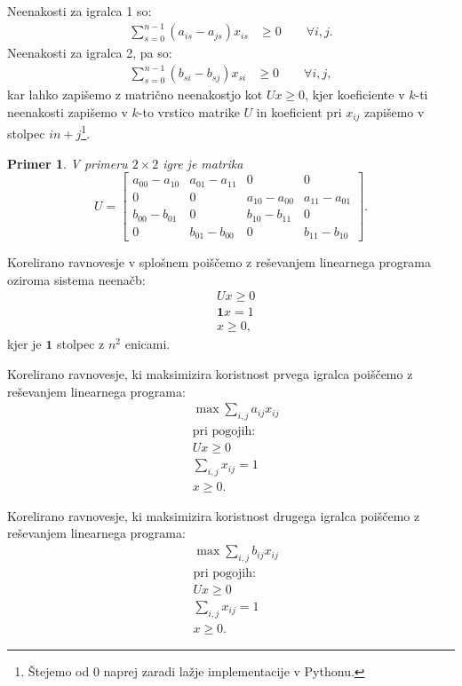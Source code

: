 \documentclass{article}
\newtheorem{example}{Primer}
\begin{document}
Neenakosti za igralca 1 so:
\begin{align*}
    \sum_{s = 0}^{n-1} (a_{is} - a_{js})x_{is} &\geq 0 \qquad \forall i,j.
\end{align*}
Neenakosti za igralca 2, pa so:
\begin{align*}
    \sum_{s = 0}^{n-1} (b_{si} - b_{sj})x_{si} &\geq 0 \qquad \forall i,j,
\end{align*}
kar lahko zapišemo z matrično neenakostjo kot $U x \geq 0$, kjer koeficiente v $k$-ti neenakosti zapišemo v $k$-to vrstico matrike $U$ in koeficient pri $x_{ij}$ zapišemo v stolpec $in + j$\footnote{Štejemo od 0 naprej zaradi lažje implementacije v Pythonu.}.

\begin{example}
    V primeru $2\times 2$ igre je matrika
    $$ U = \begin{bmatrix}
        a_{00} - a_{10} & a_{01} - a_{11} & 0 & 0\\
        0 & 0 & a_{10} - a_{00} & a_{11} - a_{01} \\
        b_{00} - b_{01} & 0 & b_{10} - b_{11} & 0 \\
        0 & b_{01} - b_{00} & 0 & b_{11} - b_{10}
        \end{bmatrix}. $$
\end{example}

Korelirano ravnovesje v splošnem poiščemo z reševanjem linearnega programa oziroma sistema neenačb:
\begin{align*}
    & U x \geq 0 \\
    &\mathbf{1}x = 1 \\
    &x \geq 0,
\end{align*}
kjer je $\mathbf{1}$ stolpec z $n^2$ enicami. 

Korelirano ravnovesje, ki maksimizira koristnost prvega igralca poiščemo z reševanjem linearnega programa:
    \begin{align*}
        &\max \sum_{i,j} a_{ij} x_{ij} \\
        &\text{pri pogojih:} \\
        & U x \geq 0 \\
        & \sum_{i,j} x_{ij} = 1 \\
        & x \geq 0.
    \end{align*}

Korelirano ravnovesje, ki maksimizira koristnost drugega igralca poiščemo z reševanjem linearnega programa:
    \begin{align*}
        & \max \sum_{i,j} b_{ij} x_{ij} \\
        & \text{pri pogojih:} \\
        & U x \geq 0 \\
        & \sum_{i,j} x_{ij} = 1 \\
        & x \geq 0.
    \end{align*}
\end{document}
